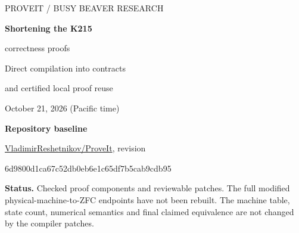 \documentclass[11pt]{article}
\theoremstyle{definition}\newtheorem{definition}[theorem]{Definition}
\newcommand{\pin}{6d9800d1ca67c52db0eb6e1c65df7b5cab9cdb95}
\newcommand{\repo}{https://github.com/VladimirReshetnikov/ProveIt/blob/6d9800d1ca67c52db0eb6e1c65df7b5cab9cdb95/}
\begin{document}
\begin{titlepage}
\vspace*{0.5cm}
{\color{teal}\large PROVEIT / BUSY BEAVER RESEARCH}\par
\vspace{0.8cm}
{\color{ink}\Huge\bfseries Shortening the K215\par correctness proofs}\par
\vspace{0.45cm}
{\LARGE Direct compilation into contracts\par and certified local proof reuse}\par
\vspace{0.9cm}
{\large October 21, 2026 (Pacific time)}\par
\vspace{0.5cm}
\textbf{Repository baseline}\par
\href{\repo}{VladimirReshetnikov/ProveIt}, revision\par
{\small\ttfamily\pin}\par
\vspace{0.8cm}
\begin{abstract}
The maintained K215 proof has already undergone fourteen Lean simplification
phases. We identify a further structural reduction and implement it in both
proof languages: interpret the existing dominated-implication theorem in the
predicate ``has a finite program satisfying the block contract.'' This compiles
the original numerical calculus directly and removes its intermediate dominated
calculus from the compiler dependency path. The Lean and Rocq-family components
are checked, with preserved public enumerator/seed interfaces and explicit
compatibility adapters.

A second contribution completes an earlier dependency-transport proposal for
the actual Lean symbolic interpreter, including the maintained Home shortcut.
Agreement on a saved finite set of table queries transports the exact executor
result; target register semantics and halting conditions remain separate.
An independent finite replay of all 6,176 K215 outcomes measures the local
supports and records reproducible evidence. We distinguish these new checks
from existing production endpoint receipts and give a prioritized integration
plan for both proof assistants.
\end{abstract}
\vfill
\colorbox{pale}{\parbox{0.94\textwidth}{\textbf{Status.} Checked proof components and
reviewable patches. The full modified physical-machine-to-ZFC endpoints have
not been rebuilt. The machine table, state count, numerical semantics and final
claimed equivalence are not changed by the compiler patches.}}
\end{titlepage}
\setcounter{page}{2}
\end{document}
